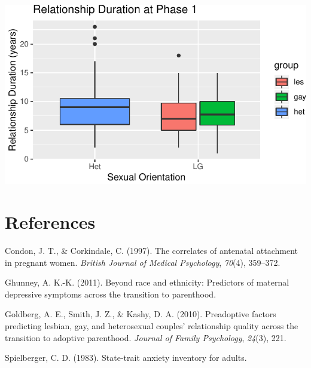 \documentclass[man]{apa6}
\begin{document}
\includegraphics{measures_descriptive_stats_files/figure-latex/fig5-1.pdf}

\newpage

\hypertarget{references}{%
\section{References}\label{references}}

\begingroup
\setlength{\parindent}{-0.5in}
\setlength{\leftskip}{0.5in}

\hypertarget{refs}{}
\leavevmode\hypertarget{ref-condon1997correlates}{}%
Condon, J. T., \& Corkindale, C. (1997). The correlates of antenatal attachment in pregnant women. \emph{British Journal of Medical Psychology}, \emph{70}(4), 359--372.

\leavevmode\hypertarget{ref-ghunney2011beyond}{}%
Ghunney, A. K.-K. (2011). Beyond race and ethnicity: Predictors of maternal depressive symptoms across the transition to parenthood.

\leavevmode\hypertarget{ref-goldberg2010preadoptive}{}%
Goldberg, A. E., Smith, J. Z., \& Kashy, D. A. (2010). Preadoptive factors predicting lesbian, gay, and heterosexual couples' relationship quality across the transition to adoptive parenthood. \emph{Journal of Family Psychology}, \emph{24}(3), 221.

\leavevmode\hypertarget{ref-spielberger1983state}{}%
Spielberger, C. D. (1983). State-trait anxiety inventory for adults.

\endgroup
\end{document}
